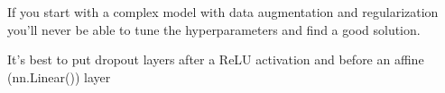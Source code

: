 If you start with a complex model with data augmentation and regularization you’ll never be able to tune the hyperparameters and find a good solution.

It’s best to put dropout layers after a ReLU activation and before an affine (nn.Linear()) layer







